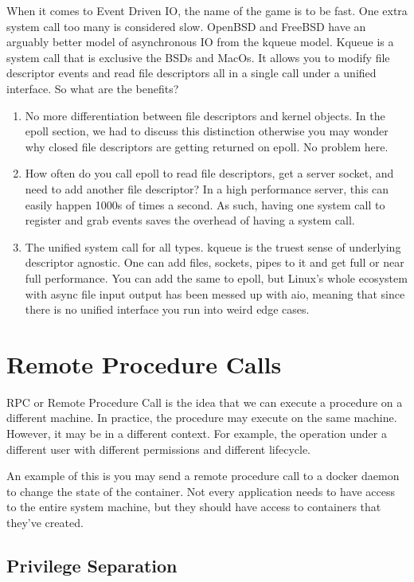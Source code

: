 When it comes to Event Driven IO, the name of the game is to be fast.
One extra system call too many is considered slow.
OpenBSD and FreeBSD have an arguably better model of asynchronous IO from the kqueue model.
Kqueue is a system call that is exclusive the BSDs and MacOs.
It allows you to modify file descriptor events and read file descriptors all in a single call under a unified interface.
So what are the benefits?

\begin{enumerate}
\item No more differentiation between file descriptors and kernel objects. In the epoll section, we had to discuss this distinction otherwise you may wonder why closed file descriptors are getting returned on epoll. No problem here.
\item How often do you call epoll to read file descriptors, get a server socket, and need to add another file descriptor?
  In a high performance server, this can easily happen 1000s of times a second.
  As such, having one system call to register and grab events saves the overhead of having a system call.
\item The unified system call for all types.
  kqueue is the truest sense of underlying descriptor agnostic.
  One can add files, sockets, pipes to it and get full or near full performance.
  You can add the same to epoll, but Linux's whole ecosystem with async file input output has been messed up with aio, meaning that since there is no unified interface you run into weird edge cases.

\end{enumerate}


\section{Remote Procedure Calls}

RPC or Remote Procedure Call is the idea that we can execute a procedure on a different machine.
In practice, the procedure may execute on the same machine.
However, it may be in a different context.
For example, the operation under a different user with different permissions and different lifecycle.

An example of this is you may send a remote procedure call to a docker daemon to change the state of the container.
Not every application needs to have access to the entire system machine, but they should have access to containers that they've created.

\subsection{Privilege Separation}


